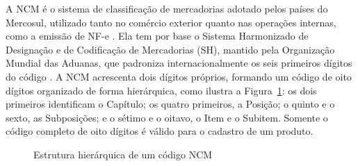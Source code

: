 A NCM é o sistema de classificação de mercadorias adotado pelos países do Mercosul, utilizado tanto no comércio exterior quanto nas operações internas, como a emissão de NF-e \cite{receita2026ncm}. Ela tem por base o Sistema Harmonizado de Designação e de Codificação de Mercadorias (SH), mantido pela Organização Mundial das Aduanas, que padroniza internacionalmente os seis primeiros dígitos do código \cite{wco2026hs}. A NCM acrescenta dois dígitos próprios, formando um código de oito dígitos organizado de forma hierárquica, como ilustra a Figura~\ref{fig:hierarquia_ncm}: os dois primeiros identificam o Capítulo; os quatro primeiros, a Posição; o quinto e o sexto, as Subposições; e o sétimo e o oitavo, o Item e o Subitem. Somente o código completo de oito dígitos é válido para o cadastro de um produto.

\begin{figure}[H]
    \centering
    \caption{Estrutura hierárquica de um código NCM}
    \label{fig:hierarquia_ncm}
\end{figure}

